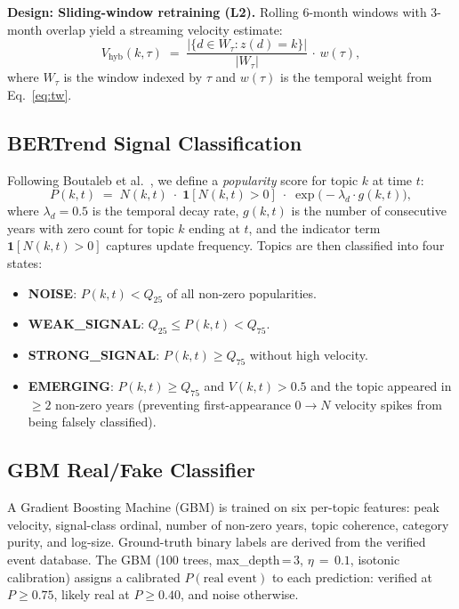 \documentclass[10pt,twocolumn,a4paper]{article}
\begin{document}
\textbf{Design: Sliding-window retraining (L2).} Rolling 6-month windows with 3-month overlap yield a streaming velocity estimate:
\begin{equation}
\label{eq:hybrid_vel}
V_{\text{hyb}}(k, \tau) \;=\; \frac{|\{d \in W_\tau : z(d) = k\}|}{|W_\tau|}\,\cdot\,w(\tau),
\end{equation}
where $W_\tau$ is the window indexed by $\tau$ and $w(\tau)$ is the temporal weight from Eq.~\eqref{eq:tw}.

\subsection{BERTrend Signal Classification}
\label{sec:bertrend}

Following Boutaleb et al.~\cite{boutaleb2024}, we define a \emph{popularity} score for topic $k$ at time $t$:
\begin{equation}
\label{eq:popularity}
P(k,t) \;=\; N(k,t)\;\cdot\;\mathbf{1}[N(k,t){>}0]\;\cdot\;\exp\!\bigl(-\lambda_d \cdot g(k,t)\bigr),
\end{equation}
where $\lambda_d{=}0.5$ is the temporal decay rate, $g(k,t)$ is the number of consecutive years with zero count for topic $k$ ending at $t$, and the indicator term $\mathbf{1}[N(k,t){>}0]$ captures update frequency. Topics are then classified into four states:
\begin{itemize}[leftmargin=*,noitemsep]
  \item \textbf{NOISE}: $P(k,t) < Q_{25}$ of all non-zero popularities.
  \item \textbf{WEAK\_SIGNAL}: $Q_{25} \leq P(k,t) < Q_{75}$.
  \item \textbf{STRONG\_SIGNAL}: $P(k,t) \geq Q_{75}$ without high velocity.
  \item \textbf{EMERGING}: $P(k,t) \geq Q_{75}$ and $V(k,t) > 0.5$ and the topic appeared in $\geq\!2$ non-zero years (preventing first-appearance 0$\to N$ velocity spikes from being falsely classified).
\end{itemize}

\subsection{GBM Real/Fake Classifier}
\label{sec:gbm}

A Gradient Boosting Machine (GBM) is trained on six per-topic features: peak velocity, signal-class ordinal, number of non-zero years, topic coherence, category purity, and log-size. Ground-truth binary labels are derived from the verified event database. The GBM (100 trees, max\_depth\,=\,3, $\eta\,=\,0.1$, isotonic calibration) assigns a calibrated $P(\text{real event})$ to each prediction: verified at $P \geq 0.75$, likely real at $P \geq 0.40$, and noise otherwise.
\end{document}
